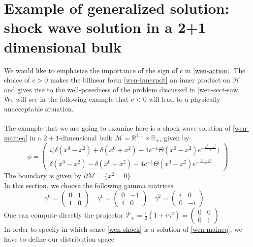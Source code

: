 \section{Example of generalized solution: shock wave solution in a 2+1 dimensional bulk}\label{appendix-wen-shockwave}
We would like to emphasize the importance of the sign of $c$ in \cref{wen-action}. 
The choice of $c>0$ makes the bilinear form \cref{wen-innerpdt} an inner product on $\mathcal{H}$ and gives rise to the well-posedness of the problem discussed in \cref{wen-sect-saw}.
We will see in the following example that $c < 0 $ will lead to a physically unacceptable situation. \\\\
The example that we are going to examine here is a shock wave solution of \cref{wen-maineq} in a $2+1$-dimensional bulk $\mathcal{M} = \mathbb{R}^{1,1}\times\mathbb{R}_+$, given by
\begin{equation}\label{wen-shock}
\phi = \begin{pmatrix}
i \big(\delta(x^0 - x^2) + \delta(x^0 + x^2) - 4c^{-1}\Theta(x^0-x^2)e^{- \frac{x^0-x^2}{c}} \big) \\
\delta({x^0 - x^2}) - \delta(x^0 + x^2) - 4c^{-1}\Theta(x^0-x^2)e^{- \frac{x^0-x^2}{c}} \end{pmatrix}
\end{equation}
The boundary is given by $\partial\mathcal{M} = \{x^2 = 0\}$ \\
In this section, we choose the following gamma matrices
\begin{equation*}
\gamma^0 = \begin{pmatrix} 0 & 1 \\ 1 &0 \end{pmatrix} \quad
\gamma^1 = \begin{pmatrix} 0 & -1 \\ 1 &0 \end{pmatrix} \quad
\gamma^2 = \begin{pmatrix} i & 0 \\ 0 &-i \end{pmatrix} \quad
\end{equation*}
One can compute directly the projector $\mathcal{P}_+ = \frac{1}{2}(1+i\gamma^2) 
= \begin{pmatrix}0 & 0 \\ 0 & 1 \end{pmatrix}$ \\
In order to specify in which sense \cref{wen-shock} is a solution of \cref{wen-maineq}, we have to define our distribution space

